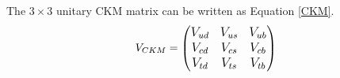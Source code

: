 \begin{comment}
\begin{figure}[H]
	\begin{minipage}[t]{0.5\linewidth} %
		\centering 
		\texttt{[image: BBbox]} 
		\caption{Box diagram for $B^0$ meson} 
		\label{fig:side:a} 
	\end{minipage}%
	\begin{minipage}[t]{0.5\linewidth} 
		\centering 
		\texttt{[image: penguin]} 
		\caption{penguin mode diagram} 
		\label{fig:side:b} 
	\end{minipage} 
\end{figure}
In Fig(1-3), the amplitude of such process depends on the mass of $W^{+/-}$ boson and  virtual intermediate quarks, in a form of:
\begin{equation}
\Large
\mathcal{A}=
\sum_{q=u,c,t}^{}
V_{qb}^{*}V_{qd} f
\begin{pmatrix}
\frac{m^2_q}{m^2_W}
\end{pmatrix}
\end{equation}
Using the unitary condition of CKM matrices,it becomes: 
\begin{equation}
\Large
\mathcal{A}=
V^*_{tb}V_{td}
\begin{bmatrix}
\frac{f}{M_W^2}
(m^2_t-m^2_c)
\end{bmatrix}
+
V^*_{ub}V_{ud}
\begin{bmatrix}
\frac{f}{M_W^2}
(m^2_u-m^2_c)
\end{bmatrix}
\end{equation}
Unexpected large mixing of $B^0_d-\bar{B^0_d}$ is hinting that the top quark could be much heavier since the up and charm quark mass difference is much smaller than the mass of $W$ boson. The amplitude in Eq(1.19) is dominant by first term, namely by the mass of top quark. 

By the discussion above, FCNC processes are largely suppressed in the SM but sensitive to the  New Physics because the unexpected amplitudes could be hints for new coupling forbidden in the SM or even the new intermediate states. The measurement of CKM  properties are the focus to validates the Yukawa sector of the SM and any large deviation could kick the door to New Physics.  
\end{comment}
The $3\times 3$ unitary CKM matrix can be written as Equation \ref{CKM}.
\begin{equation}\label{CKM}
\large
V_{CKM}=
\begin{pmatrix}
V_{ud} & V_{us} & V_{ub}\\
V_{cd} & V_{cs} & V_{cb}\\
V_{td} & V_{ts} & V_{tb}\\
\end{pmatrix}
\end{equation}

